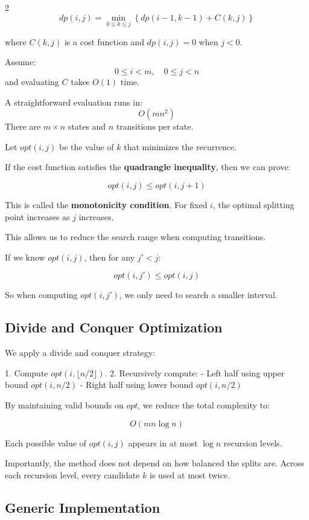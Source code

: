 \documentclass[a4paper,landscape]{article}
\begin{document}
\begin{multicols}{2}
\[
dp(i, j) = \min_{0 \le k \le j}
\left\{ dp(i - 1, k - 1) + C(k, j) \right\}
\]

where \( C(k, j) \) is a cost function and  
\( dp(i, j) = 0 \) when \( j < 0 \).

Assume:
\[
0 \le i < m, \quad 0 \le j < n
\]
and evaluating \( C \) takes \( O(1) \) time.

A straightforward evaluation runs in:
\[
O(m n^2)
\]
There are \( m \times n \) states and \( n \) transitions per state.

Let \( opt(i, j) \) be the value of \( k \) that minimizes the recurrence.

If the cost function satisfies the \textbf{quadrangle inequality}, then we can prove:

\[
opt(i, j) \le opt(i, j+1)
\]

This is called the \textbf{monotonicity condition}.  
For fixed \( i \), the optimal splitting point increases as \( j \) increases.

This allows us to reduce the search range when computing transitions.

If we know \( opt(i, j) \), then for any \( j' < j \):

\[
opt(i, j') \le opt(i, j)
\]

So when computing \( opt(i, j') \), we only need to search a smaller interval.

\subsection*{Divide and Conquer Optimization}

We apply a divide and conquer strategy:

1. Compute \( opt(i, \lfloor n/2 \rfloor) \).
2. Recursively compute:
   - Left half using upper bound \( opt(i, n/2) \)
   - Right half using lower bound \( opt(i, n/2) \)

By maintaining valid bounds on \( opt \), we reduce the total complexity to:

\[
O(m n \log n)
\]

Each possible value of \( opt(i, j) \) appears in at most \( \log n \) recursion levels.

Importantly, the method does not depend on how balanced the splits are.  
Across each recursion level, every candidate \( k \) is used at most twice.

\subsection*{Generic Implementation}


\end{multicols}
\end{document}
